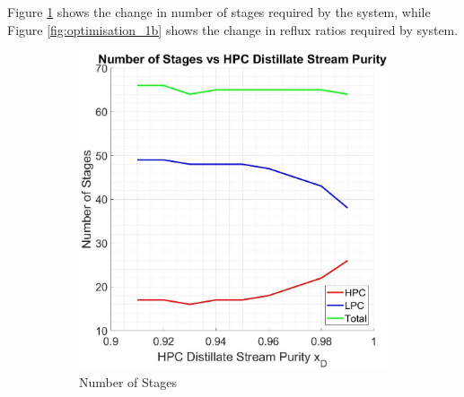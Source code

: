     \noindent Figure \ref{fig:optimisation_1a} shows the change in number of stages required by the system, while Figure \ref{fig:optimisation_1b} shows the change in reflux ratios required by system. \\
    \begin{figure}[ht]
        \centering
        \begin{subfigure}{0.49\textwidth}
            \includegraphics[width=\linewidth]{airseparation/graphics/graph-stages_vs_HPCxD.jpg}
            \caption{Number of Stages} \label{fig:optimisation_1a}
        \end{subfigure}
        \hspace*{\fill} %
        \begin{subfigure}{0.49\textwidth}

\end{subfigure}
\end{figure}
